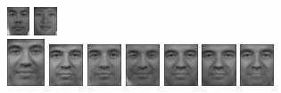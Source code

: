 \begin{figure}[hbt]
  \includegraphics[width=0.06\textwidth]{../results/H_rez/correct90/1/9.jpg}
  \includegraphics[width=0.06\textwidth]{../results/H_rez/correct90/1/10.jpg} \\
  \vspace{4pt}
  \includegraphics[width=0.1\textwidth]{../results/H_rez/correct90/2/testImg.jpg} \vline
  \hspace{2pt}
  \includegraphics[width=0.09\textwidth]{../results/H_rez/correct90/2/1.jpg}
  \includegraphics[width=0.09\textwidth]{../results/H_rez/correct90/2/2.jpg}
  \includegraphics[width=0.09\textwidth]{../results/H_rez/correct90/2/3.jpg}
  \includegraphics[width=0.09\textwidth]{../results/H_rez/correct90/2/4.jpg}
  \includegraphics[width=0.09\textwidth]{../results/H_rez/correct90/2/5.jpg}
  \includegraphics[width=0.09\textwidth]{../results/H_rez/correct90/2/6.jpg}

\end{figure}

